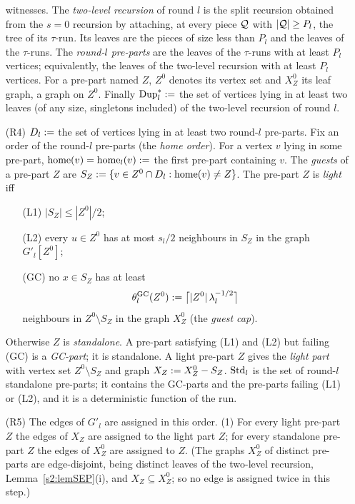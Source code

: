 \begin{definition}
\begin{enumerate}
witnesses. The \emph{two-level recursion} of round $l$ is the split recursion
obtained from the $s=0$ recursion by attaching, at every piece $\piece$ with
$|\piece|\ge P_l$, the tree of its $\tau$-run. Its leaves are the pieces of
size less than $P_l$ and the leaves of the $\tau$-runs. The \emph{round-$l$
pre-parts} are the leaves of the $\tau$-runs with at least $P_l$ vertices;
equivalently, the leaves of the two-level recursion with at least $P_l$
vertices. For a pre-part named $Z$, $Z^0$ denotes its vertex set and $X^0_Z$
its leaf graph, a graph on $Z^0$. Finally
$\Dups_l\defeq$ the set of vertices lying in at least two leaves (of any size,
singletons included) of the two-level recursion of round $l$.
\item[(R4)] $D_l\mathrel{:=}$ the set of vertices lying in at
least two round-$l$ pre-parts. Fix an order of the round-$l$ pre-parts (the
\emph{home order}). For a vertex $v$ lying in some pre-part,
$\mathrm{home}(v)=\mathrm{home}_l(v)\mathrel{:=}$ the first pre-part containing $v$. The
\emph{guests} of a pre-part $Z$ are $S_Z\mathrel{:=}\{v\in Z^0\cap D_l:\mathrm{home}(v)\ne
Z\}$. The pre-part $Z$ is \emph{light} iff
\begin{enumerate}
\item[(L1)] $|S_Z|\le|Z^0|/2$;
\item[(L2)] every $u\in Z^0$ has at most $s_l/2$ neighbours in $S_Z$ in the
graph $G'_l[Z^0]$;
\item[(GC)] no $x\in S_Z$ has at least
\[
\theta^{\mathrm{GC}}_l(Z^0)\mathrel{:=}\bigl\lceil|Z^0|\,\lambda_l^{-1/2}\bigr\rceil
\]
neighbours in $Z^0\setminus S_Z$ in the graph $X^0_Z$ (the \emph{guest cap}).
\end{enumerate}
Otherwise $Z$ is \emph{standalone}. A pre-part satisfying (L1) and (L2) but
failing (GC) is a \emph{GC-part}; it is standalone. A light pre-part $Z$ gives
the \emph{light part} with vertex set $Z^0\setminus S_Z$ and graph
$X_Z\mathrel{:=} X^0_Z-S_Z$. $\mathrm{Std}_l$ is the set of round-$l$ standalone pre-parts;
it contains the GC-parts and the pre-parts failing (L1) or (L2), and it is a
deterministic function of the run.
\item[(R5)] The edges of $G'_l$ are assigned in this
order.
(1) For every light pre-part $Z$ the edges of $X_Z$ are assigned to the light
part $Z$; for every standalone pre-part $Z$ the edges of $X^0_Z$ are assigned
to $Z$. (The graphs $X^0_Z$ of distinct pre-parts are edge-disjoint, being
distinct leaves of the two-level recursion, Lemma~\ref{s2:lemSEP}(i), and
$X_Z\subseteq X^0_Z$; so no edge is assigned twice in this step.)

\end{enumerate}
\end{definition}
